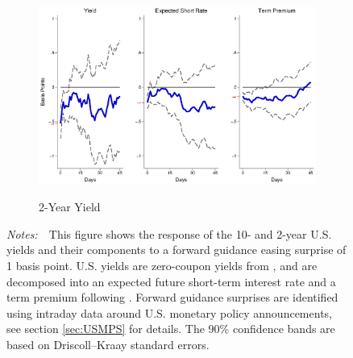 \documentclass[a4paper, 12pt]{article}
\newcommand{\figtext}[1]{
	\vspace{-1ex}
	\captionsetup{justification=justified,font=footnotesize}
	\caption*{#1}
}
\newcommand{\fignotes}[1]{\figtext{\emph{Notes:~}~#1}}
\begin{document}
\begin{appendices}
\begin{landscape}
\begin{figure}[tbph]
\begin{center}
\begin{minipage}{\linewidth}
\begin{center}
						\begin{subfigure}[t]{\linewidth}
							\includegraphics[trim={0cm 0cm 0cm 0cm},clip,height=0.35\textheight,width=\linewidth]{../Figures/PathUSDnomyptp24mPost.eps} \\
							\vspace{-0.35cm}
							\caption{2-Year Yield} \label{subfig:LPUS2YpathPost}
						\end{subfigure}
						\vspace{-0.45cm}
					\end{center}
					\fignotes{This figure shows the response of the 10- and 2-year U.S. yields and their components to a forward guidance easing surprise of 1 basis point. U.S. yields are zero-coupon yields from \cite{GSW:2007}, and are decomposed into an expected future short-term interest rate and a term premium following \cite{KimWright:2005}. Forward guidance surprises are identified using intraday data around U.S. monetary policy announcements, see section \ref{sec:USMPS} for details. The 90\% confidence bands are based on Driscoll--Kraay standard errors.}
				\end{minipage}
			\end{center}
		\end{figure}
		
		\pagebreak[4]
		

\end{landscape}
\end{appendices}
\end{document}
